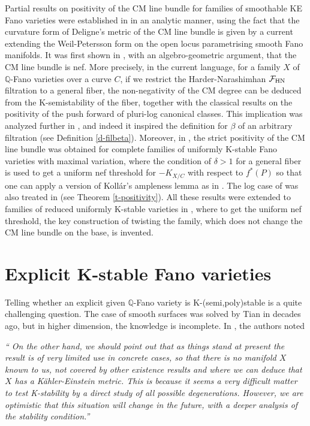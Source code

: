 \documentclass[12pt,reqno]{amsart}%
\newcommand{\cF}{\mathcal{F}}
\theoremstyle{definition}
\theoremstyle{remark}
\newcommand{\bQ}{{\mathbb{Q}}}
\begin{document}
Partial results on positivity of the CM line bundle for families of smoothable KE Fano varieties were  established in \cite{LWX18a} in an analytic manner, using the fact that the curvature form of  Deligne's metric of the CM line bundle is given by a current extending the Weil-Petersson form on the open locus parametrising smooth Fano manifolds.  It was first shown in \cite{CP18}, with an algebro-geometric argument, that the CM line bundle is nef. More precisely, in the current language, for a family $X$ of $\bQ$-Fano varieties over a curve $C$, if we restrict the Harder-Narashimhan $\cF_{\rm HN}$ filtration to a general fiber,  the non-negativity of the CM degree can be deduced from the K-semistability of the fiber, together with the classical results on the positivity of the push forward of pluri-log canonical classes. This implication was analyzed further in \cite{XZ19}, and indeed it inspired the definition for $\beta$ of an arbitrary filtration (see Definition \ref{d-filbeta}). Moreover, in \cite{CP18}, the strict positivity of the CM line bundle was obtained for complete families of uniformly K-stable Fano varieties with maximal variation, where the condition of $\delta>1$ for a general fiber is used to get a uniform nef threshold for $-K_{X/C}$ with respect to $f^*(P)$ so that one can apply a version of Koll\'ar's ampleness lemma as in \cite{Kol90, KP17}. The log case of \cite{CP18} was also treated in \cite{Pos19} (see Theorem \ref{t-positivity}). All these results were extended to families of reduced uniformly K-stable varieties in \cite{XZ19}, where to get the uniform nef threshold,  the key construction of twisting the family, which does not change the CM line bundle on the base, is invented.
\clearpage





\part{Explicit  K-stable Fano varieties}\label{p-example}






Telling whether an explicit given $\mathbb{Q}$-Fano variety is K-(semi,poly)stable is a quite challenging question.  The case of smooth surfaces was solved by Tian in \cite{Tia90} decades ago, but in higher dimension, the knowledge is  incomplete. 
In \cite{CDS}, the authors noted

\medskip

{\it `` On the other hand, we should point out that as things stand at present the result is of very limited use in concrete
cases, so that there is no manifold $X$ known to us, not covered by other existence
results and where we can deduce that $X$ has a K\"ahler-Einstein metric. This is
because it seems a very difficult matter to test K-stability by a direct study of all
possible degenerations. However, we are optimistic that this situation will change
in the future, with a deeper analysis of the stability condition.''}
\end{document}
